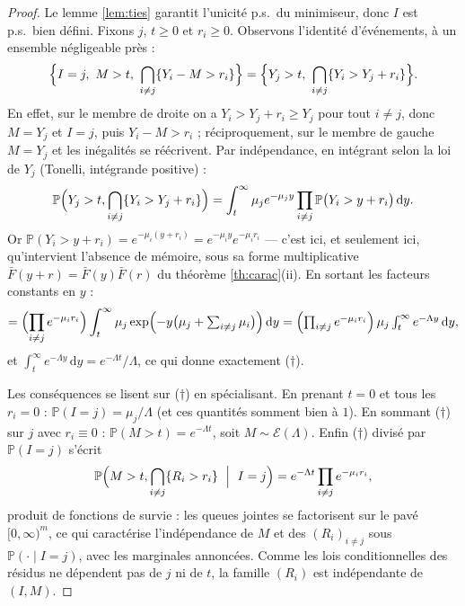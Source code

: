 \documentclass[11pt,a4paper]{article}
\theoremstyle{plain}
\theoremstyle{definition}
\theoremstyle{remark}
\newcommand{\Prob}{\mathbb{P}}
\newcommand{\Expo}{\mathcal{E}}
\newcommand{\barF}{\bar{F}}
\newcommand{\dd}{\,\mathrm{d}}
\begin{document}
\begin{proof}
Le lemme \ref{lem:ties} garantit l'unicité p.s.\ du minimiseur, donc $I$ est
p.s.\ bien défini. Fixons $j$, $t\ge0$ et $r_i\ge0$. Observons l'identité
d'événements, à un ensemble négligeable près :
\[
\Bigl\{I=j,\ M>t,\ \bigcap_{i\ne j}\{Y_i-M>r_i\}\Bigr\}
=\Bigl\{Y_j>t,\ \bigcap_{i\ne j}\{Y_i>Y_j+r_i\}\Bigr\}.
\]
En effet, sur le membre de droite on a $Y_i>Y_j+r_i\ge Y_j$ pour tout $i\ne j$,
donc $M=Y_j$ et $I=j$, puis $Y_i-M>r_i$ ; réciproquement, sur le membre de gauche
$M=Y_j$ et les inégalités se réécrivent. Par indépendance, en intégrant selon la
loi de $Y_j$ (Tonelli, intégrande positive) :
\[
\Prob\Bigl(Y_j>t,\bigcap_{i\ne j}\{Y_i>Y_j+r_i\}\Bigr)
=\int_t^{\infty}\mu_j e^{-\mu_j y}\prod_{i\ne j}\Prob\bigl(Y_i>y+r_i\bigr)\dd y .
\]
Or $\Prob(Y_i>y+r_i)=e^{-\mu_i(y+r_i)}=e^{-\mu_i y}e^{-\mu_i r_i}$ --- c'est ici,
et seulement ici, qu'intervient l'absence de mémoire, sous sa forme
multiplicative $\barF(y+r)=\barF(y)\barF(r)$ du théorème \ref{th:carac}(ii). En
sortant les facteurs constants en $y$ :
\[
=\Bigl(\prod_{i\ne j}e^{-\mu_i r_i}\Bigr)\int_t^{\infty}\mu_j
\exp\Bigl(-y\bigl(\mu_j+\textstyle\sum_{i\ne j}\mu_i\bigr)\Bigr)\dd y
=\Bigl(\prod_{i\ne j}e^{-\mu_i r_i}\Bigr)\,\mu_j\int_t^\infty e^{-\Lambda y}\dd y ,
\]
et $\int_t^\infty e^{-\Lambda y}\dd y=e^{-\Lambda t}/\Lambda$, ce qui donne
exactement ($\dagger$).

Les conséquences se lisent sur ($\dagger$) en spécialisant. En prenant $t=0$ et
tous les $r_i=0$ : $\Prob(I=j)=\mu_j/\Lambda$ (et ces quantités somment bien à
$1$). En sommant ($\dagger$) sur $j$ avec $r_i\equiv0$ : $\Prob(M>t)=e^{-\Lambda t}$,
soit $M\sim\Expo(\Lambda)$. Enfin ($\dagger$) divisé par $\Prob(I=j)$ s'écrit
\[
\Prob\Bigl(M>t,\bigcap_{i\ne j}\{R_i>r_i\}\ \Bigm|\ I=j\Bigr)
=e^{-\Lambda t}\prod_{i\ne j}e^{-\mu_i r_i},
\]
produit de fonctions de survie : les queues jointes se factorisent sur le pavé
$[0,\infty)^{m}$, ce qui caractérise l'indépendance de $M$ et des $(R_i)_{i\ne j}$
sous $\Prob(\cdot\mid I=j)$, avec les marginales annoncées. Comme les lois
conditionnelles des résidus ne dépendent pas de $j$ ni de $t$, la famille
$(R_i)$ est indépendante de $(I,M)$.
\end{proof}
\end{document}
